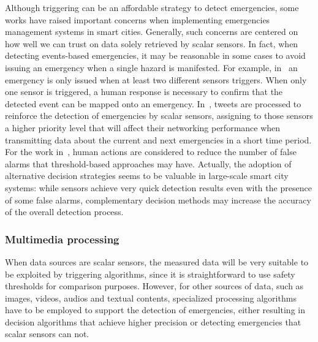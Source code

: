\begin{refsection}
Although triggering can be an affordable strategy to detect emergencies, some works have raised important concerns when implementing emergencies management systems in smart cities. Generally, such concerns are centered on how well we can trust on data solely retrieved by scalar sensors. In fact, when detecting events-based emergencies, it may be reasonable in some cases to avoid issuing an emergency when a single hazard is manifested. For example, in~\cite{iotFire1} an emergency is only issued when at least two different sensors triggers. When only one sensor is triggered, a human response is necessary to confirm that the detected event can be mapped onto an emergency. In~\cite{twitterDetection2}, tweets are processed to reinforce the detection of emergencies by scalar sensors, assigning to those sensors a higher priority level that will affect their networking performance when transmitting data about the current and next emergencies in a short time period. For the work in~\cite{humanAssisted1}, human actions are considered to reduce the number of false alarms that threshold-based approaches may have. Actually, the adoption of alternative decision strategies seems to be valuable in large-scale smart city systems: while sensors achieve very quick detection results even with the presence of some false alarms, complementary decision methods may increase the accuracy of the overall detection process.

\subsubsection{Multimedia processing}

When data sources are scalar sensors, the measured data will be very suitable to be exploited by triggering algorithms, since it is straightforward to use safety thresholds for comparison purposes. However, for other sources of data, such as images, videos, audios and textual contents, specialized  processing algorithms have to be employed to support the detection of emergencies, either resulting in decision algorithms that achieve higher precision or detecting emergencies that scalar sensors can not. 


\end{refsection}

